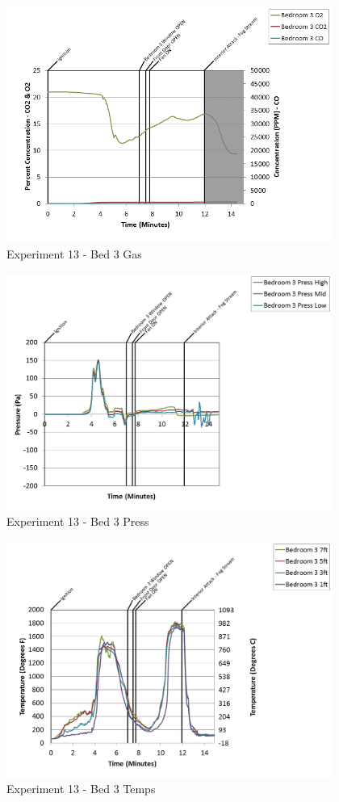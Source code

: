 \documentclass{article}
\begin{document}
\begin{appendices}
\clearpage

\begin{figure}[h!]
	\centering
	\includegraphics[height=3.05in]{0_Images/Results_Charts/Exp_13_Charts/Bed3Gas.png}
	\caption{Experiment 13 - Bed 3 Gas}
\end{figure}


\begin{figure}[h!]
	\centering
	\includegraphics[height=3.05in]{0_Images/Results_Charts/Exp_13_Charts/Bed3Press.png}
	\caption{Experiment 13 - Bed 3 Press}
\end{figure}

\clearpage

\begin{figure}[h!]
	\centering
	\includegraphics[height=3.05in]{0_Images/Results_Charts/Exp_13_Charts/Bed3Temps.png}
	\caption{Experiment 13 - Bed 3 Temps}
\end{figure}



\end{appendices}
\end{document}

